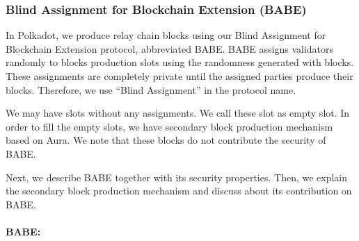 \subsubsection{Blind Assignment for Blockchain Extension (BABE)}

In Polkadot, we produce relay chain blocks using our Blind Assignment for Blockchain Extension protocol, abbreviated BABE. BABE assigns validators randomly to blocks production slots using  the randomness generated with blocks. These assignments are completely private until the assigned parties produce their blocks. Therefore, we use ``Blind Assignment'' in the protocol name. 

We may have slots without any assignments. We call these slot as empty slot. In order to fill the empty slots, we have secondary block production mechanism based on Aura. We note that these blocks do not contribute the security of BABE. 

Next, we describe BABE together with its security properties. Then, we explain the secondary block production mechanism and discuss about its contribution on BABE.

\paragraph{BABE:}






